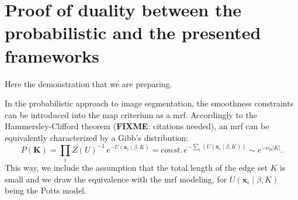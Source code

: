 
%

\appendices

\section{Proof of duality between the probabilistic and the presented frameworks}
Here the demonstration that we are preparing.


In the probabilistic approach to image segmentation, the smoothness constraints
can be introduced into the \gls{map} criterium as a \gls{mrf}. Accordingly to the
Hammersley-Clifford theorem (\textbf{FIXME}: citations needed), an \gls{mrf} can
be equivalently characterized by a Gibb's distribution:
\begin{equation}
P(\mathbf{K})=\underset{i}{\prod} Z(U)^{-1}\,e^{-U(\mathbf{x}_i \mid \beta,K)} = \mathit{const.}\,e^{- \sum\limits_i \left( U(\mathbf{x}_i \mid \beta,K) \right) } \sim e^{-\nu_B \left| K \right| }.
\end{equation}
This way, we include the assumption that the total length of the edge set $K$ is small
and we draw the equivalence with the \gls{mrf} modeling, for $U(\mathbf{x}_i \mid \beta,K)$
being the Potts model.


